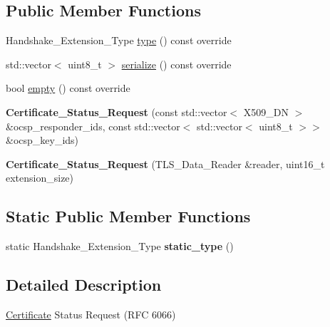 \subsection*{Public Member Functions}
\begin{DoxyCompactItemize}
\item 
Handshake\+\_\+\+Extension\+\_\+\+Type \hyperlink{class_botan_1_1_t_l_s_1_1_certificate___status___request_a30a98ada0f7b8cfaec9514794a22f54f}{type} () const override
\item 
std\+::vector$<$ uint8\+\_\+t $>$ \hyperlink{class_botan_1_1_t_l_s_1_1_certificate___status___request_a912d1c631e0a38a80df00c8f073cdc2a}{serialize} () const override
\item 
bool \hyperlink{class_botan_1_1_t_l_s_1_1_certificate___status___request_ae4224e1787859f27cbba86a038e1fc78}{empty} () const override
\item 
\mbox{\label{class_botan_1_1_t_l_s_1_1_certificate___status___request_a509fae0cf078260839287a27e052f20a}} 
{\bfseries Certificate\+\_\+\+Status\+\_\+\+Request} (const std\+::vector$<$ X509\+\_\+\+DN $>$ \&ocsp\+\_\+responder\+\_\+ids, const std\+::vector$<$ std\+::vector$<$ uint8\+\_\+t $>$$>$ \&ocsp\+\_\+key\+\_\+ids)
\item 
\mbox{\label{class_botan_1_1_t_l_s_1_1_certificate___status___request_aa80e742016c92641ec6a3c8a8a126f4d}} 
{\bfseries Certificate\+\_\+\+Status\+\_\+\+Request} (T\+L\+S\+\_\+\+Data\+\_\+\+Reader \&reader, uint16\+\_\+t extension\+\_\+size)
\end{DoxyCompactItemize}
\subsection*{Static Public Member Functions}
\begin{DoxyCompactItemize}
\item 
\mbox{\label{class_botan_1_1_t_l_s_1_1_certificate___status___request_aff7acaffb93aad60769353dc6cec40fb}} 
static Handshake\+\_\+\+Extension\+\_\+\+Type {\bfseries static\+\_\+type} ()
\end{DoxyCompactItemize}


\subsection{Detailed Description}
\hyperlink{class_botan_1_1_t_l_s_1_1_certificate}{Certificate} Status Request (R\+FC 6066) 

